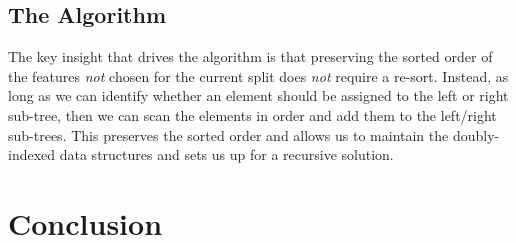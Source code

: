 \documentclass[12pt,letterpaper]{article}
\begin{document}
\subsection{The Algorithm}

The key insight that drives the algorithm is that preserving the sorted order of
the features {\em not} chosen for the current split does {\em not} require a
re-sort. Instead, as long as we can identify whether an element should be
assigned to the left or right sub-tree, then we can scan the elements in order
and add them to the left/right sub-trees. This preserves the sorted order and
allows us to maintain the doubly-indexed data structures and sets us up for a
recursive solution.


\section{Conclusion}

\TBC



\end{document}
